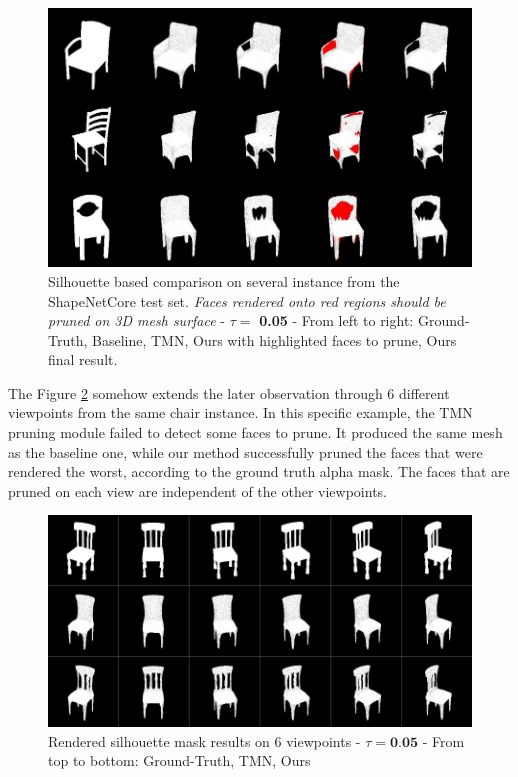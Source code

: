 \begin{figure}[htp!]%
\begin{center}
\includegraphics[width=\linewidth]{images/adaptativesr/highlight_faces.png}
\end{center}
    \caption{Silhouette based comparison on several instance from the ShapeNetCore test set. \textit{Faces rendered onto red regions should be pruned on 3D mesh surface} - $\tau = $ \textbf{0.05} - From left to right: Ground-Truth, Baseline, TMN\citep{pan2019deep}, Ours with highlighted faces to prune, Ours final result.}
\label{fig:face2prune}
\end{figure}

The Figure \ref{fig:pruning_multi_view} somehow extends the later observation through 6 different viewpoints from the same chair instance. In this specific example, the TMN pruning module failed to detect some faces to prune. It produced the same mesh as the baseline one, while our method successfully pruned the faces that were rendered the worst, according to the ground truth alpha mask. The faces that are pruned on each view are independent of the other viewpoints. 

\begin{figure}[htp!]%
\begin{center}
\includegraphics[width=\linewidth]{images/adaptativesr/severalview2D.png}
\end{center}
    \caption{Rendered silhouette mask results on 6 viewpoints - $\tau =\textbf{0.05}$ - From top to bottom: Ground-Truth, TMN\citep{pan2019deep},  Ours}
\label{fig:pruning_multi_view}
\end{figure}


